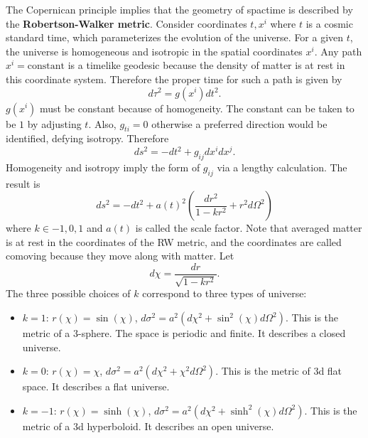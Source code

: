 \documentclass[11pt]{article}
\begin{document}
The Copernican principle implies that the geometry of spactime is described by the \textbf{Robertson-Walker metric}.
Consider coordinates $t, x^i$ where $t$ is a cosmic standard time, which parameterizes the evolution of the universe. 
For a given $t$, the universe is homogeneous and isotropic in the spatial coordinates $x^i$.
Any path $x^i = \textrm{constant}$ is a timelike geodesic because the density of matter is at rest in this coordinate system.
Therefore the proper time for such a path is given by
$$ d\tau^2 = g(x^i) dt^2. $$
$g(x^i)$ must be constant because of homogeneity.
The constant can be taken to be $1$ by adjusting $t$.
Also, $g_{ti} = 0$ otherwise a preferred direction would be identified, defying isotropy.
Therefore 
$$ ds^2 = -dt^2 + g_{ij} dx^i dx^j. $$
Homogeneity and isotropy imply the form of $g_{ij}$ via a lengthy calculation.
The result is
$$ ds^2 = -dt^2 + a(t)^2 \left( \frac{dr^2}{1 - k r^2} + r^2 d\Omega^2 \right) $$
where $k \in {-1, 0, 1}$ and $a(t)$ is called the scale factor.
Note that averaged matter is at rest in the coordinates of the RW metric, and the coordinates are called comoving because they move along with matter.
Let 
$$ d\chi = \frac{dr}{\sqrt{1-kr^2}}. $$
The three possible choices of $k$ correspond to three types of universe:
\begin{itemize}
\item $k = 1$: $r(\chi) = \sin(\chi)$, $d\sigma^2 =a^2 \left( d\chi^2 + \sin^2(\chi) d\Omega^2 \right).$ This is the metric of a $3$-sphere. The space is periodic and finite. It describes a closed universe.
\item $k = 0$: $r(\chi) = \chi$, $d\sigma^2 = a^2 \left( d\chi^2 + \chi^2 d\Omega^2 \right).$ This is the metric of 3d flat space. It describes a flat universe.
\item $k = -1$: $r(\chi) = \sinh(\chi)$, $d\sigma^2 =a^2 \left( d\chi^2 + \sinh^2(\chi) d\Omega^2 \right).$ This is the metric of a 3d hyperboloid. It describes an open universe.
\end{itemize}
\end{document}
